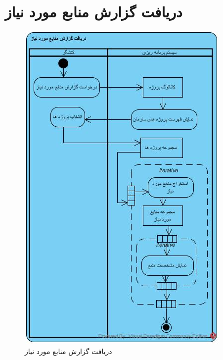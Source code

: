 \section{دریافت گزارش منابع مورد نیاز}
\begin{figure}[H]
	\centering
	\includegraphics[scale=0.7]{img/activity/RequiredResourcesReport}
	\caption{دریافت گزارش منابع مورد نیاز}
\end{figure}

